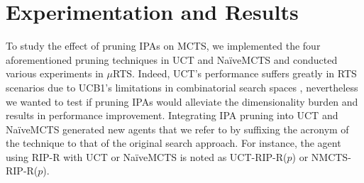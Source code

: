 \documentclass[conference]{IEEEtran}
\newcommand{\mRTS}{$\mu$RTS}
\begin{document}

\begin{center}
\end{center}




\section{Experimentation and Results}
\label{sec:experiments}


To study the effect of pruning IPAs on MCTS, we implemented the four aforementioned pruning techniques in UCT and NaïveMCTS and conducted various experiments in \mRTS{}. Indeed, UCT's performance suffers greatly in RTS scenarios due to UCB1's limitations in combinatorial search spaces \cite{ontanon_combinatorial_2017}, nevertheless we wanted to test if pruning IPAs would alleviate the dimensionality burden and results in performance improvement. Integrating IPA pruning into UCT and NaïveMCTS generated new agents that we refer to by suffixing the acronym of the technique to that of the original search approach. For instance, the agent using RIP-R with UCT or NaïveMCTS is noted as UCT-RIP-R($p$) or NMCTS-RIP-R($p$).
\end{document}
